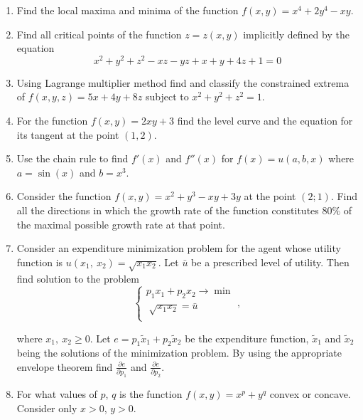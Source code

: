 \documentclass[12pt]{article} %
\theoremstyle{definition} %
\begin{document}
\begin{enumerate}
  \item  Find the local maxima and minima of the function $f(x,y)=x^4+2y^4-xy$.
  \item
Find all critical points of the function $z=z(x,y)$ implicitly defined by the equation
\begin{equation}
x^2+y^2+z^2-xz-yz+x+y+4z+1=0
\end{equation}
\item
Using Lagrange multiplier method find and classify the constrained extrema of $f(x, y, z) =  5x +4y + 8z$ subject to $x^2 + y^2 + z^2 = 1$.
\item
  For the function $f(x,y)=2xy+3$ find the level curve and the equation for its tangent at the point $(1,2)$.
\item
Use the chain rule to find $f'(x)$ and $f''(x)$ for $f(x)=u(a,b,x)$ where $a=\sin(x)$ and $b=x^3$.
\item
Consider the function $f(x,y)=x^2+y^3-xy+3y$ at the point $(2;1)$. Find all the directions in which the  growth rate of the function constitutes $80\%$ of the maximal possible growth rate at that point.
\item Consider an expenditure minimization problem for the agent whose utility function is $u({{x}_{1}},\ {{x}_{2}})=\sqrt{{{x}_{1}}{{x}_{2}}}$. Let $\bar{u}$ be a prescribed level of utility. Then find solution to the problem
\[
  \begin{cases}
    {{p}_{1}}{{x}_{1}}+{{p}_{2}}{{x}_{2}}\to \min   \\
    \sqrt[{}]{{{x}_{1}}{{x}_{2}}}=\bar{u}  \\
  \end{cases},
\]

where ${x}_{1},\ {{x}_{2}}\ge 0$. Let $e={{p}_{1}}{{\tilde{x}}_{1}}+{{p}_{2}}{{\tilde{x}}_{2}}$ be the expenditure function, ${{\tilde{x}}_{1}}$ and ${{\tilde{x}}_{2}}$ being the solutions of the minimization problem. By using the appropriate envelope theorem find $\frac{\partial e}{\partial {{p}_{1}}}$ and $\frac{\partial e}{\partial {{p}_{2}}}$.
\item
 For what values of $p$, $q$ is the function $f(x,y)={{x}^{p}}+{{y}^{q}}$ convex or concave. Consider only $x>0$, $y>0$.
\end{enumerate}
\end{document}
